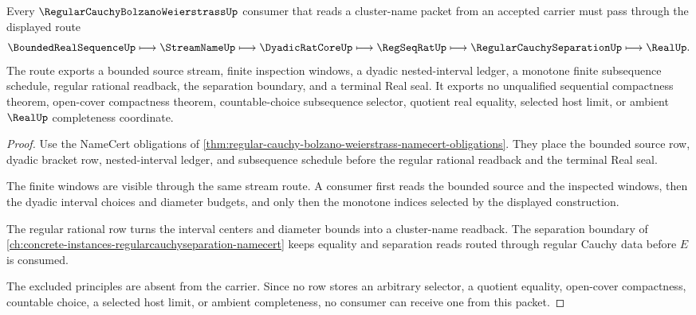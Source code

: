 \begin{theorem}
\label{thm:regular-cauchy-bolzano-weierstrass-explicit-subsequence-route}
Every $\RegularCauchyBolzanoWeierstrassUp$ consumer that reads a cluster-name packet from an accepted carrier must pass through the displayed route
$$
\BoundedRealSequenceUp \longmapsto \StreamNameUp \longmapsto \DyadicRatCoreUp \longmapsto \RegSeqRatUp \longmapsto \RegularCauchySeparationUp \longmapsto \RealUp .
$$
The route exports a bounded source stream, finite inspection windows, a dyadic nested-interval ledger, a monotone finite subsequence schedule, regular rational readback, the separation boundary, and a terminal Real seal. It exports no unqualified sequential compactness theorem, open-cover compactness theorem, countable-choice subsequence selector, quotient real equality, selected host limit, or ambient $\RealUp$ completeness coordinate.
\end{theorem}
\begin{proof}
Use the NameCert obligations of \autoref{thm:regular-cauchy-bolzano-weierstrass-namecert-obligations}. They place the bounded source row, dyadic bracket row, nested-interval ledger, and subsequence schedule before the regular rational readback and the terminal Real seal.

The finite windows are visible through the same stream route. A consumer first reads the bounded source and the inspected windows, then the dyadic interval choices and diameter budgets, and only then the monotone indices selected by the displayed construction.

The regular rational row turns the interval centers and diameter bounds into a cluster-name readback. The separation boundary of \autoref{ch:concrete-instances-regularcauchyseparation-namecert} keeps equality and separation reads routed through regular Cauchy data before $E$ is consumed.

The excluded principles are absent from the carrier. Since no row stores an arbitrary selector, a quotient equality, open-cover compactness, countable choice, a selected host limit, or ambient completeness, no consumer can receive one from this packet.
\end{proof}

